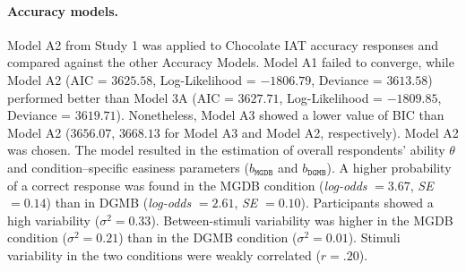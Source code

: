 \documentclass[12pt]{book}
\begin{document}
\paragraph{Accuracy models.}
Model A2 from Study 1 was applied to Chocolate IAT accuracy responses and compared against the other Accuracy Models. Model A1 failed to converge, while Model A2 (AIC = $3625.58$, Log-Likelihood = $-1806.79$, Deviance = $3613.58$) performed better than Model 3A (AIC = $3627.71$, Log-Likelihood  = $-1809.85$, Deviance  = $3619.71$). Nonetheless, Model A3 showed a lower value of BIC than Model A2 ($3656.07$, $3668.13$ for Model A3 and Model A2, respectively). Model A2 was chosen. The model resulted in the estimation of overall respondents' ability $\theta$ and condition--specific easiness parameters ($b_{\texttt{MGDB}}$ and $b_{\texttt{DGMB}}$).
A higher probability of a correct response was found in the MGDB condition (\emph{log-odds} $= 3.67$, \emph{SE} $= 0.14$) than in DGMB (\emph{log-odds} $= 2.61$, \emph{SE} $= 0.10$). Participants showed a high variability ($\sigma^2 = 0.33$). Between-stimuli variability was higher in the MGDB condition ($\sigma^2 = 0.21$) than in the DGMB condition ($\sigma^2 = 0.01$). Stimuli variability in the two conditions were weakly correlated  ($r = .20$). 

\end{document}
